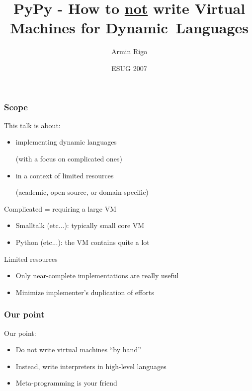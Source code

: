\documentclass[utf8x]{beamer}
\title{PyPy - How to \underline{not} write Virtual Machines for \mbox{Dynamic Languages}}
\author{Armin Rigo}
\institute[Heinrich-Heine-Universität Düsseldorf]
{
  Institut für Informatik\\
  Heinrich-Heine-Universität Düsseldorf
}
\date{ESUG 2007}
\begin{document}
\begin{frame}
  \titlepage
\end{frame}


\begin{frame}
  \frametitle{Scope}
  This talk is about:

  \begin{itemize}
  \item
    implementing dynamic languages \par(with a focus on complicated ones)
  \item
    in a context of limited resources \par(academic, open source, or
    domain-specific)
  \end{itemize}
  \pause
  \begin{block}{
    Complicated = requiring a large VM}
    \begin{itemize}
    \item
      Smalltalk (etc...): typically small core VM
    \item
      Python (etc...): the VM contains quite a lot
    \end{itemize}
  \end{block}
  \pause
  \begin{block}{
    Limited resources}
    \begin{itemize}
    \item
      Only near-complete implementations are really useful
    \item
      Minimize implementer's duplication of efforts
    \end{itemize}
  \end{block}
\end{frame}

\begin{frame}
  \frametitle{Our point}
  Our point:

    \begin{itemize}
    \item
      Do not write virtual machines ``by hand''
    \item
      Instead, write interpreters in high-level languages
    \item
      Meta-programming is your friend
    \end{itemize}
\end{frame}
\end{document}
